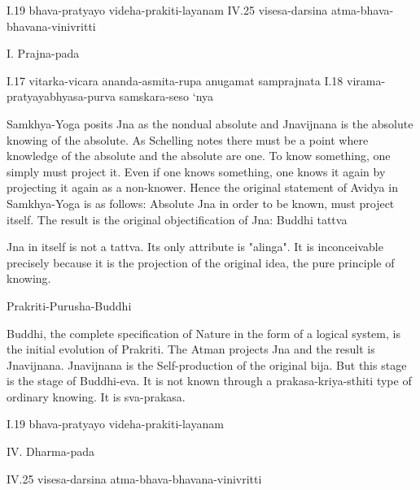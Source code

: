 
I.19 bhava-pratyayo videha-prakiti-layanam
IV.25 visesa-darsina atma-bhava-bhavana-vinivritti

I. Prajna-pada

I.17 vitarka-vicara ananda-asmita-rupa anugamat samprajnata
I.18 virama-pratyayabhyasa-purva samskara-seso ‘nya

Samkhya-Yoga posits Jna as the nondual absolute and Jnavijnana is the
absolute knowing of the absolute. As Schelling notes there must be a point
where knowledge of the absolute and the absolute are one.
To know something, one simply must project it.
Even if one knows something, one knows it again by projecting it again as a
non-knower. Hence the original statement of Avidya in Samkhya-Yoga is as follows:
Absolute Jna in order to be known, must project itself.
The result is the original objectification of Jna: Buddhi tattva

Jna in itself is not a tattva. Its only attribute is "alinga".
It is inconceivable precisely because it is the projection of the original idea,
the pure principle of knowing.

Prakriti-Purusha-Buddhi

Buddhi, the complete specification of Nature in the form of a logical system,
is the initial evolution of Prakriti. The Atman projects Jna and the result
is Jnavijnana.
  Jnavijnana is the Self-production of the original bija.
But this stage is the stage of Buddhi-eva. It is not known through a
prakasa-kriya-sthiti type of ordinary knowing. It is sva-prakasa.

I.19 bhava-pratyayo videha-prakiti-layanam

IV. Dharma-pada

IV.25 visesa-darsina atma-bhava-bhavana-vinivritti
